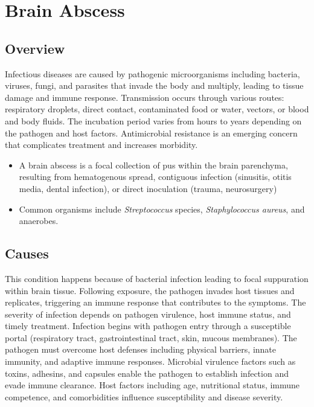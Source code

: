 \chapter{Brain Abscess}
\label{sec:Brain Abscess}

\section{Overview}
Infectious diseases are caused by pathogenic microorganisms including bacteria, viruses, fungi, and parasites that invade the body and multiply, leading to tissue damage and immune response. Transmission occurs through various routes: respiratory droplets, direct contact, contaminated food or water, vectors, or blood and body fluids. The incubation period varies from hours to years depending on the pathogen and host factors. Antimicrobial resistance is an emerging concern that complicates treatment and increases morbidity.

\begin{itemize}[noitemsep]
  \item A brain abscess is a focal collection of pus within the brain parenchyma, resulting from hematogenous spread, contiguous infection (sinusitis, otitis media, dental infection), or direct inoculation (trauma, neurosurgery)
  \item Common organisms include \textit{Streptococcus} species, \textit{Staphylococcus aureus}, and anaerobes.
\end{itemize}
\section{Causes}
This condition happens because of bacterial infection leading to focal suppuration within brain tissue. Following exposure, the pathogen invades host tissues and replicates, triggering an immune response that contributes to the symptoms. The severity of infection depends on pathogen virulence, host immune status, and timely treatment.   Infection begins with pathogen entry through a susceptible portal (respiratory tract, gastrointestinal tract, skin, mucous membranes). The pathogen must overcome host defenses including physical barriers, innate immunity, and adaptive immune responses. Microbial virulence factors such as toxins, adhesins, and capsules enable the pathogen to establish infection and evade immune clearance. Host factors including age, nutritional status, immune competence, and comorbidities influence susceptibility and disease severity.

